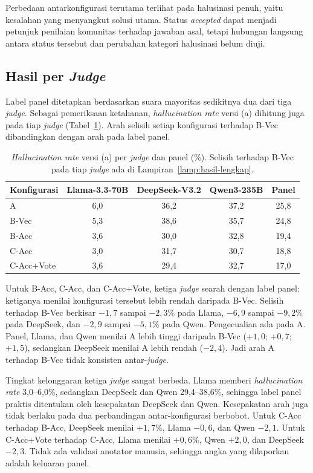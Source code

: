 Perbedaan antarkonfigurasi terutama terlihat pada halusinasi penuh, yaitu kesalahan yang menyangkut solusi utama. Status \emph{accepted} dapat menjadi petunjuk penilaian komunitas terhadap jawaban asal, tetapi hubungan langsung antara status tersebut dan perubahan kategori halusinasi belum diuji.
\subsection{Hasil per \emph{Judge}}
\label{subsec:hasil-per-judge}
Label panel ditetapkan berdasarkan suara mayoritas sedikitnya dua dari tiga \emph{judge}. Sebagai pemeriksaan ketahanan, \emph{hallucination rate} versi (a) dihitung juga pada tiap \emph{judge} (Tabel~\ref{tab:per-judge}). Arah selisih setiap konfigurasi terhadap B-Vec dibandingkan dengan arah pada label panel.
\begin{table}[!htbp]
\centering
\small
\caption{\emph{Hallucination rate} versi (a) per \emph{judge} dan panel (\%). Selisih terhadap B-Vec pada tiap \emph{judge} ada di Lampiran~\ref{lamp:hasil-lengkap}.}
\label{tab:per-judge}
\renewcommand{\arraystretch}{1.2}
\begin{tabular}{|l|c|c|c|c|}
\hline
\textbf{Konfigurasi} & \textbf{Llama-3.3-70B} & \textbf{DeepSeek-V3.2} & \textbf{Qwen3-235B} & \textbf{Panel} \\
\hline
A & 6,0 & 36,2 & 37,2 & 25,8 \\
B-Vec & 5,3 & 38,6 & 35,7 & 24,8 \\
B-Acc & 3,6 & 30,0 & 32,8 & 19,4 \\
C-Acc & 3,0 & 31,7 & 30,7 & 18,8 \\
C-Acc+Vote & 3,6 & 29,4 & 32,7 & 17,0 \\
\hline
\end{tabular}
\end{table}

Untuk B-Acc, C-Acc, dan C-Acc+Vote, ketiga \emph{judge} searah dengan label panel: ketiganya menilai konfigurasi tersebut lebih rendah daripada B-Vec. Selisih terhadap B-Vec berkisar $-1{,}7$ sampai $-2{,}3$\% pada Llama, $-6{,}9$ sampai $-9{,}2$\% pada DeepSeek, dan $-2{,}9$ sampai $-5{,}1$\% pada Qwen. Pengecualian ada pada A. Panel, Llama, dan Qwen menilai A lebih tinggi daripada B-Vec ($+1{,}0$; $+0{,}7$; $+1{,}5$), sedangkan DeepSeek menilai A lebih rendah ($-2{,}4$). Jadi arah A terhadap B-Vec tidak konsisten antar-\emph{judge}.

Tingkat kelonggaran ketiga \emph{judge} sangat berbeda. Llama memberi \emph{hallucination rate} 3,0--6,0\%, sedangkan DeepSeek dan Qwen 29,4--38,6\%, sehingga label panel praktis ditentukan oleh kesepakatan DeepSeek dan Qwen. Kesepakatan arah juga tidak berlaku pada dua perbandingan antar-konfigurasi berbobot. Untuk C-Acc terhadap B-Acc, DeepSeek menilai $+1{,}7$\%, Llama $-0{,}6$, dan Qwen $-2{,}1$. Untuk C-Acc+Vote terhadap C-Acc, Llama menilai $+0{,}6$\%, Qwen $+2{,}0$, dan DeepSeek $-2{,}3$. Tidak ada validasi anotator manusia, sehingga angka yang dilaporkan adalah keluaran panel.

